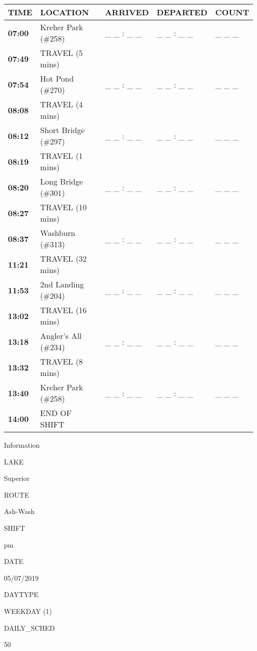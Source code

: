 \documentclass[]{article}
\begin{document}
\begin{tabular}{>{\bfseries}lllll}
\toprule
\textbf{TIME} & \textbf{LOCATION} & \textbf{ARRIVED} & \textbf{DEPARTED} & \textbf{COUNT}\\
\midrule
07:00 & Kreher Park (\#258) & \_ \_ : \_ \_ & \_ \_ : \_ \_ & \_ \_ \_\\
07:49 & TRAVEL (5 mins) &  &  & \\
07:54 & Hot Pond (\#270) & \_ \_ : \_ \_ & \_ \_ : \_ \_ & \_ \_ \_\\
08:08 & TRAVEL (4 mins) &  &  & \\
08:12 & Short Bridge (\#297) & \_ \_ : \_ \_ & \_ \_ : \_ \_ & \_ \_ \_\\
08:19 & TRAVEL (1 mins) &  &  & \\
08:20 & Long Bridge (\#301) & \_ \_ : \_ \_ & \_ \_ : \_ \_ & \_ \_ \_\\
08:27 & TRAVEL (10 mins) &  &  & \\
08:37 & Washburn (\#313) & \_ \_ : \_ \_ & \_ \_ : \_ \_ & \_ \_ \_\\
11:21 & TRAVEL (32 mins) &  &  & \\
11:53 & 2nd Landing (\#204) & \_ \_ : \_ \_ & \_ \_ : \_ \_ & \_ \_ \_\\
13:02 & TRAVEL (16 mins) &  &  & \\
13:18 & Angler's All (\#234) & \_ \_ : \_ \_ & \_ \_ : \_ \_ & \_ \_ \_\\
13:32 & TRAVEL (8 mins) &  &  & \\
13:40 & Kreher Park (\#258) & \_ \_ : \_ \_ & \_ \_ : \_ \_ & \_ \_ \_\\
14:00 & END OF SHIFT &  &  & \\
\bottomrule
\end{tabular}\newpage

Information

LAKE

Superior

ROUTE

Ash-Wash

SHIFT

pm

DATE

05/07/2019

DAYTYPE

WEEKDAY (1)

DAILY\_SCHED

50

\vspace{24pt}
\end{document}
